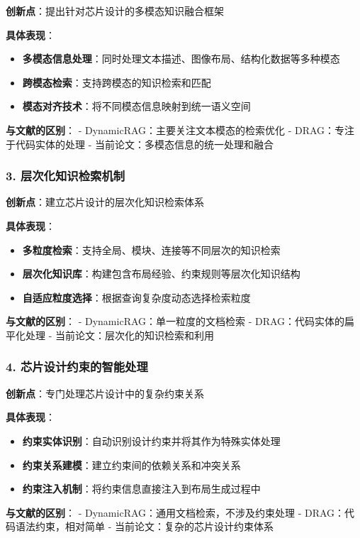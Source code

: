 \documentclass{ctexart}
\begin{document}
\textbf{创新点}：提出针对芯片设计的多模态知识融合框架

\textbf{具体表现}：
\begin{itemize}
    \item \textbf{多模态信息处理}：同时处理文本描述、图像布局、结构化数据等多种模态
    \item \textbf{跨模态检索}：支持跨模态的知识检索和匹配
    \item \textbf{模态对齐技术}：将不同模态信息映射到统一语义空间
\end{itemize}

\textbf{与文献的区别}：
- DynamicRAG：主要关注文本模态的检索优化
- DRAG：专注于代码实体的处理
- 当前论文：多模态信息的统一处理和融合

\subsubsection{3. 层次化知识检索机制}

\textbf{创新点}：建立芯片设计的层次化知识检索体系

\textbf{具体表现}：
\begin{itemize}
    \item \textbf{多粒度检索}：支持全局、模块、连接等不同层次的知识检索
    \item \textbf{层次化知识库}：构建包含布局经验、约束规则等层次化知识结构
    \item \textbf{自适应粒度选择}：根据查询复杂度动态选择检索粒度
\end{itemize}

\textbf{与文献的区别}：
- DynamicRAG：单一粒度的文档检索
- DRAG：代码实体的扁平化处理
- 当前论文：层次化的知识检索和利用

\subsubsection{4. 芯片设计约束的智能处理}

\textbf{创新点}：专门处理芯片设计中的复杂约束关系

\textbf{具体表现}：
\begin{itemize}
    \item \textbf{约束实体识别}：自动识别设计约束并将其作为特殊实体处理
    \item \textbf{约束关系建模}：建立约束间的依赖关系和冲突关系
    \item \textbf{约束注入机制}：将约束信息直接注入到布局生成过程中
\end{itemize}

\textbf{与文献的区别}：
- DynamicRAG：通用文档检索，不涉及约束处理
- DRAG：代码语法约束，相对简单
- 当前论文：复杂的芯片设计约束体系
\end{document}
